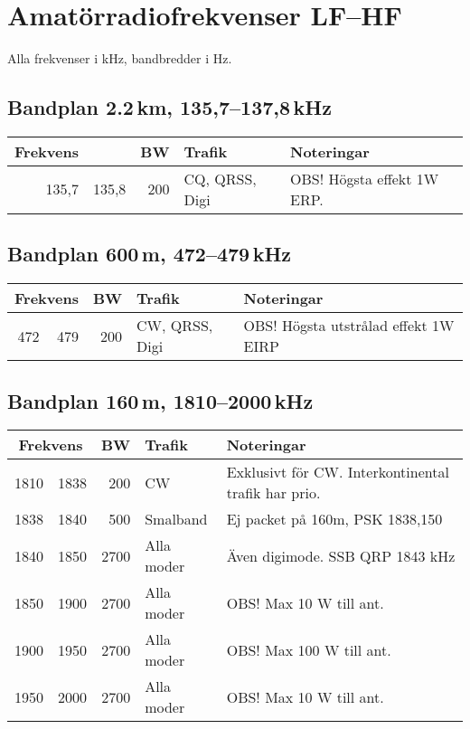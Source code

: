 \section{Amatörradiofrekvenser LF--HF}

Alla frekvenser i kHz, bandbredder i Hz.

\subsection{Bandplan 2.2\,km, 135,7--137,8\,kHz}

\begin{tabular}{rrrll}
\textbf{Frekvens} &  & \textbf{BW} & \textbf{Trafik} & \textbf{Noteringar} \\ \hline
135,7 & 135,8 & 200 & CQ, QRSS, Digi & OBS! Högsta effekt 1W ERP. \\ \hline
\end{tabular}

\subsection{Bandplan 600\,m, 472--479\,kHz}
\begin{tabular}{rrrll}
\multicolumn{2}{c}{\textbf{Frekvens}} & \textbf{BW} & \textbf{Trafik} & \textbf{Noteringar} \\ \hline
472 & 479 & 200 & CW, QRSS, Digi & OBS! Högsta utstrålad effekt 1W EIRP \\ \hline
\end{tabular}

\subsection{Bandplan 160\,m, 1810--2000\,kHz}
\begin{tabular}{rrrll}
\multicolumn{2}{c}{\textbf{Frekvens}} & \textbf{BW} & \textbf{Trafik} & \textbf{Noteringar} \\ \hline
1810 & 1838 & 200  & CW         & Exklusivt för CW. Interkontinental trafik har prio. \\ \hline
1838 & 1840 & 500  & Smalband   & Ej packet på 160m, PSK 1838,150                    \\ \hline
1840 & 1850 & 2700 & Alla moder & Även digimode. SSB QRP 1843 kHz                    \\ \hline
1850 & 1900 & 2700 & Alla moder & OBS! Max 10 W till ant.                             \\ \hline
1900 & 1950 & 2700 & Alla moder & OBS! Max 100 W till ant.                            \\ \hline
1950 & 2000 & 2700 & Alla moder & OBS! Max 10 W till ant.                             \\ \hline
\end{tabular}

